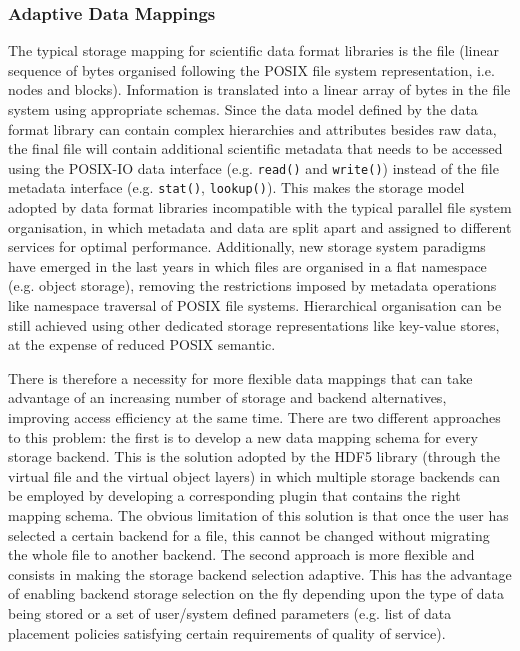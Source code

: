 

\subsubsection{Adaptive Data Mappings}
The typical storage mapping for scientific data format libraries is the file (linear sequence of bytes organised following the POSIX file system representation, i.e. nodes and blocks). Information is translated into a linear array of bytes in the file system using appropriate schemas. Since the data model defined by the data format library can contain complex hierarchies and attributes besides raw data, the final file will contain additional scientific metadata that needs to be accessed using the POSIX-IO data interface (e.g. \texttt{read()} and \texttt{write()}) instead of the file metadata interface (e.g. \texttt{stat()}, \texttt{lookup()}). This makes the storage model adopted by data format libraries incompatible with the typical parallel file system organisation, in which metadata and data are split apart and assigned to different services for optimal performance. Additionally, new storage system paradigms have emerged in the last years in which files are organised in a flat namespace (e.g. object storage), removing the restrictions imposed by metadata operations like namespace traversal of POSIX file systems. Hierarchical organisation can be still achieved using other dedicated storage representations like key-value stores, at the expense of reduced POSIX semantic.

There is therefore a necessity for more flexible data mappings that can take advantage of an increasing number of storage and backend alternatives, improving access efficiency at the same time. There are two different approaches to this problem: the first is to develop a new data mapping schema for every storage backend. This is the solution adopted by the HDF5 library (through the virtual file and the virtual object layers) in which multiple storage backends can be employed by developing a corresponding plugin that contains the right mapping schema. The obvious limitation of this solution is that once the user has selected a certain backend for a file, this cannot be changed without migrating the whole file to another backend. The second approach is more flexible and consists in making the storage backend selection adaptive. This has the advantage of enabling backend storage selection on the fly depending upon the type of data being stored or a set of user/system defined parameters (e.g. list of data placement policies satisfying certain requirements of quality of service).

